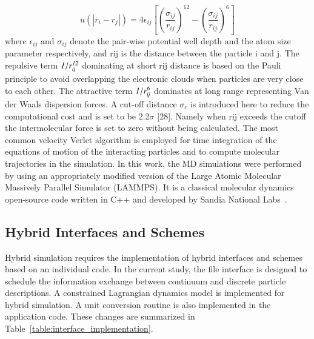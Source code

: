 \documentclass[preprint,12pt]{elsarticle}
\begin{document}
\vspace{-.2em}
\begin{equation}
 u(|r_{i} - r_{j}|) = 4\epsilon_{ij}[(\frac{\sigma_{ij}}{r_{ij}})^{12}-(\frac{\sigma_{ij}}{r_{ij}})^{6}]
 \label{eq:LJ12}
\end{equation}
\normalsize
where  $\epsilon_{ij}$ and $\sigma_{ij}$ denote the pair-wise potential well depth and the atom size parameter respectively, and rij is the distance between the particle i and j. The repulsive term $\it 1/r_{ij}^{12}$ dominating at short rij distance is based on the Pauli principle to avoid overlapping the electronic clouds when particles are very close to each other. The attractive term $\it 1/r_{ij}^{6}$ dominates at long range representing Van der Waals dispersion forces. A cut-off distance $\sigma_{c}$  is introduced here to reduce the computational cost and is set to be 2.2$\sigma$  [28]. Namely when rij exceeds the cutoff the intermolecular force is set to zero without being calculated.
The most common velocity Verlet algorithm is employed for time integration of the equations of motion of the interacting particles and to compute molecular trajectories in the simulation. 
In this work, the MD simulations were performed by using an appropriately modified version of the Large Atomic Molecular Massively Parallel Simulator (LAMMPS). It is a classical molecular dynamics open-source code written in C++ and developed by Sandia National Labs~\cite{LAMMPS_url}.



\subsection{Hybrid Interfaces and Schemes}
\label{sec:numerical_hybridschemes}

Hybrid simulation requires the implementation of hybrid interfaces and schemes based on an individual code. In the current study, the file interface is designed to schedule the information exchange between continuum and discrete particle descriptions. A constrained Lagrangian dynamics model is implemented for hybrid simulation. A unit conversion routine is also implemented in the application code. These changes are summarized in Table~\ref{table:interface_implementation}. 
\end{document}
